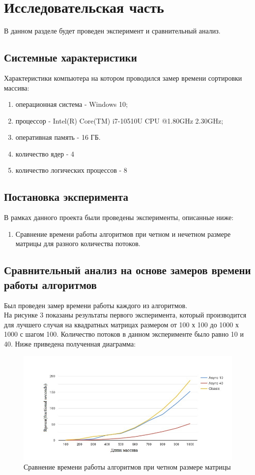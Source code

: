\documentclass[a4paper, 12pt]{article}
\begin{document}
\section{Исследовательская часть }
\begin{flushleft}
	\hspace*{5mm} В данном разделе будет проведен эксперимент и сравнительный анализ.
	\subsection{Системные характеристики}
	Характеристики компьютера на котором проводился замер времени сортировки массива:
	\begin{enumerate}
		\item операционная система - Windows 10;
		\item процессор - Intel(R) Core(TM) i7-10510U CPU @1.80GHz 2.30GHz;
		\item оперативная память - 16 ГБ.
		\item количество ядер - 4
		\item количество логических процессов - 8
	\end{enumerate}
	\subsection{Постановка эксперимента}
	В рамках данного проекта были проведены эксперименты, описанные ниже:
	\begin{enumerate}
		\item Сравнение времени работы алгоритмов при четном и нечетном размере матрицы для разного количества потоков.
	\end{enumerate}
	\clearpage
	\newpage
	\subsection{Сравнительный анализ на основе замеров времени работы алгоритмов}
	Был проведен замер времени работы каждого из алгоритмов.
	\\ \hspace*{5mm} На рисунке 3 показаны результаты первого эксперимента, который производится для лучшего случая на квадратных матрицах размером от 100 х 100 до 1000 х 1000 с шагом 100. Количество потоков в данном эксперименте было равно 10 и 40. Ниже приведена полученная диаграмма:
	\begin{figure}[h]
		\centering \includegraphics[scale=2]{even}
		\centering\caption{Сравнение времени работы алгоритмов при четном размере матрицы}
	\end{figure}
	

\end{flushleft}
\end{document}
